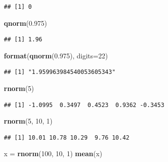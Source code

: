 \documentclass[10pt,]{krantz}
\makeatletter
\newenvironment{Shaded}{\begin{snugshade}}{\end{snugshade}}
\newcommand{\KeywordTok}[1]{\textcolor[rgb]{0.13,0.29,0.53}{\textbf{#1}}}
\newcommand{\DataTypeTok}[1]{\textcolor[rgb]{0.13,0.29,0.53}{#1}}
\newcommand{\DecValTok}[1]{\textcolor[rgb]{0.00,0.00,0.81}{#1}}
\newcommand{\FloatTok}[1]{\textcolor[rgb]{0.00,0.00,0.81}{#1}}
\newcommand{\StringTok}[1]{\textcolor[rgb]{0.31,0.60,0.02}{#1}}
\newcommand{\NormalTok}[1]{#1}
\newenvironment{kframe}{%
\medskip{}
\setlength{\fboxsep}{.8em}
 \def\at@end@of@kframe{}%
 \ifinner\ifhmode%
  \def\at@end@of@kframe{\end{minipage}}%
  \begin{minipage}{\columnwidth}%
 \fi\fi%
 \def\FrameCommand##1{\hskip\@totalleftmargin \hskip-\fboxsep
 \colorbox{shadecolor}{##1}\hskip-\fboxsep
     \hskip-\linewidth \hskip-\@totalleftmargin \hskip\columnwidth}%
 \MakeFramed {\advance\hsize-\width
   \@totalleftmargin\z@ \linewidth\hsize
   \@setminipage}}%
 {\par\unskip\endMakeFramed%
 \at@end@of@kframe}
\renewenvironment{Shaded}{\begin{kframe}}{\end{kframe}}
\makeatother
\begin{document}
\begin{verbatim}
## [1] 0
\end{verbatim}

\begin{Shaded}
\begin{Highlighting}[]
\KeywordTok{qnorm}\NormalTok{(}\FloatTok{0.975}\NormalTok{)}
\end{Highlighting}
\end{Shaded}

\begin{verbatim}
## [1] 1.96
\end{verbatim}

\begin{Shaded}
\begin{Highlighting}[]
\KeywordTok{format}\NormalTok{(}\KeywordTok{qnorm}\NormalTok{(}\FloatTok{0.975}\NormalTok{), }\DataTypeTok{digits=}\DecValTok{22}\NormalTok{)}
\end{Highlighting}
\end{Shaded}

\begin{verbatim}
## [1] "1.959963984540053605343"
\end{verbatim}

\begin{Shaded}
\begin{Highlighting}[]
\KeywordTok{rnorm}\NormalTok{(}\DecValTok{5}\NormalTok{)}
\end{Highlighting}
\end{Shaded}

\begin{verbatim}
## [1] -1.0995  0.3497  0.4523  0.9362 -0.3453
\end{verbatim}

\begin{Shaded}
\begin{Highlighting}[]
\KeywordTok{rnorm}\NormalTok{(}\DecValTok{5}\NormalTok{, }\DecValTok{10}\NormalTok{, }\DecValTok{1}\NormalTok{)}
\end{Highlighting}
\end{Shaded}

\begin{verbatim}
## [1] 10.01 10.78 10.29  9.76 10.42
\end{verbatim}

\begin{Shaded}
\begin{Highlighting}[]
\NormalTok{x =}\StringTok{ }\KeywordTok{rnorm}\NormalTok{(}\DecValTok{100}\NormalTok{, }\DecValTok{10}\NormalTok{, }\DecValTok{1}\NormalTok{)}
\KeywordTok{mean}\NormalTok{(x)}
\end{Highlighting}
\end{Shaded}
\end{document}

